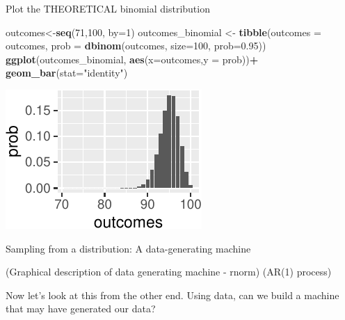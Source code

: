 \documentclass[
  12pt,
  ignorenonframetext,
  aspectratio=169,
]{beamer}
\newenvironment{Shaded}{\begin{snugshade}}{\end{snugshade}}
\newcommand{\DataTypeTok}[1]{\textcolor[rgb]{0.13,0.29,0.53}{#1}}
\newcommand{\DecValTok}[1]{\textcolor[rgb]{0.00,0.00,0.81}{#1}}
\newcommand{\FloatTok}[1]{\textcolor[rgb]{0.00,0.00,0.81}{#1}}
\newcommand{\KeywordTok}[1]{\textcolor[rgb]{0.13,0.29,0.53}{\textbf{#1}}}
\newcommand{\NormalTok}[1]{#1}
\newcommand{\OperatorTok}[1]{\textcolor[rgb]{0.81,0.36,0.00}{\textbf{#1}}}
\newcommand{\StringTok}[1]{\textcolor[rgb]{0.31,0.60,0.02}{#1}}
\begin{document}
\begin{frame}[fragile]{Plot the THEORETICAL binomial distribution}
\protect\hypertarget{plot-the-theoretical-binomial-distribution}{}

\begin{Shaded}
\begin{Highlighting}[]
\NormalTok{outcomes<-}\KeywordTok{seq}\NormalTok{(}\DecValTok{71}\NormalTok{,}\DecValTok{100}\NormalTok{, }\DataTypeTok{by=}\DecValTok{1}\NormalTok{)}
\NormalTok{outcomes_binomial <-}\StringTok{ }\KeywordTok{tibble}\NormalTok{(}\DataTypeTok{outcomes =}\NormalTok{ outcomes, }
                            \DataTypeTok{prob =} \KeywordTok{dbinom}\NormalTok{(outcomes, }\DataTypeTok{size=}\DecValTok{100}\NormalTok{, }\DataTypeTok{prob=}\FloatTok{0.95}\NormalTok{))}
\KeywordTok{ggplot}\NormalTok{(outcomes_binomial, }\KeywordTok{aes}\NormalTok{(}\DataTypeTok{x=}\NormalTok{outcomes,}\DataTypeTok{y =}\NormalTok{ prob))}\OperatorTok{+}
\StringTok{   }\KeywordTok{geom_bar}\NormalTok{(}\DataTypeTok{stat=}\StringTok{"identity"}\NormalTok{)}
\end{Highlighting}
\end{Shaded}

\begin{center}\includegraphics{Lecture-2_files/figure-beamer/unnamed-chunk-4-1} \end{center}

\end{frame}

\begin{frame}{Sampling from a distribution: A data-generating machine}
\protect\hypertarget{sampling-from-a-distribution-a-data-generating-machine}{}

(Graphical description of data generating machine - rnorm) (AR(1)
process)

Now let's look at this from the other end. Using data, can we build a
machine that may have generated our data?

\end{frame}
\end{document}

